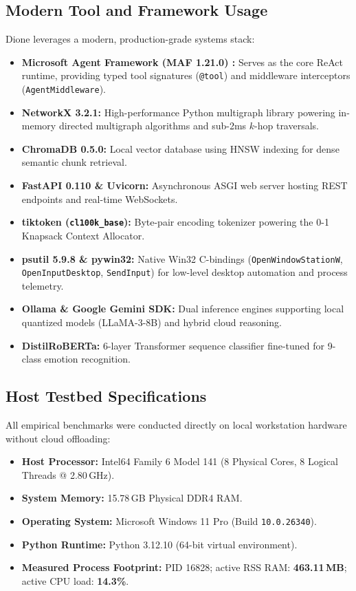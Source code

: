 \documentclass[conference,a4paper]{IEEEtran}
\begin{document}
\subsection{Modern Tool and Framework Usage}
Dione leverages a modern, production-grade systems stack:
\begin{itemize}
    \item \textbf{Microsoft Agent Framework (MAF 1.21.0) \cite{microsoft2025agentframework}:} Serves as the core ReAct runtime, providing typed tool signatures (\texttt{@tool}) and middleware interceptors (\texttt{AgentMiddleware}).
    \item \textbf{NetworkX 3.2.1:} High-performance Python multigraph library powering in-memory directed multigraph algorithms and sub-2ms $k$-hop traversals.
    \item \textbf{ChromaDB 0.5.0:} Local vector database using HNSW indexing for dense semantic chunk retrieval.
    \item \textbf{FastAPI 0.110 \& Uvicorn:} Asynchronous ASGI web server hosting REST endpoints and real-time WebSockets.
    \item \textbf{tiktoken (\texttt{cl100k\_base}):} Byte-pair encoding tokenizer powering the 0-1 Knapsack Context Allocator.
    \item \textbf{psutil 5.9.8 \& pywin32:} Native Win32 C-bindings (\texttt{OpenWindowStationW}, \texttt{OpenInputDesktop}, \texttt{SendInput}) for low-level desktop automation and process telemetry.
    \item \textbf{Ollama \& Google Gemini SDK:} Dual inference engines supporting local quantized models (LLaMA-3-8B) and hybrid cloud reasoning.
    \item \textbf{DistilRoBERTa:} 6-layer Transformer sequence classifier fine-tuned for 9-class emotion recognition.
\end{itemize}

\subsection{Host Testbed Specifications}
All empirical benchmarks were conducted directly on local workstation hardware without cloud offloading:
\begin{itemize}
    \item \textbf{Host Processor:} Intel64 Family 6 Model 141 (8 Physical Cores, 8 Logical Threads @ 2.80\,GHz).
    \item \textbf{System Memory:} 15.78\,GB Physical DDR4 RAM.
    \item \textbf{Operating System:} Microsoft Windows 11 Pro (Build \texttt{10.0.26340}).
    \item \textbf{Python Runtime:} Python 3.12.10 (64-bit virtual environment).
    \item \textbf{Measured Process Footprint:} PID 16828; active RSS RAM: \textbf{463.11\,MB}; active CPU load: \textbf{14.3\%}.
\end{itemize}
\end{document}

